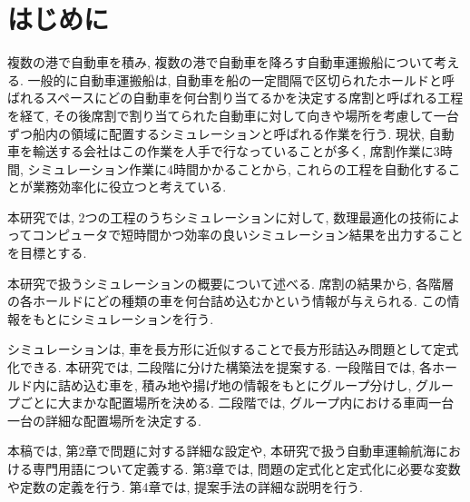 \chapter{はじめに}

複数の港で自動車を積み, 複数の港で自動車を降ろす自動車運搬船について考える. 
一般的に自動車運搬船は, 自動車を船の一定間隔で区切られたホールドと呼ばれるスペースにどの自動車を何台割り当てるかを決定する席割と呼ばれる工程を経て, その後席割で割り当てられた自動車に対して向きや場所を考慮して一台ずつ船内の領域に配置するシミュレーションと呼ばれる作業を行う. 
現状, 自動車を輸送する会社はこの作業を人手で行なっていることが多く, 席割作業に3時間, シミュレーション作業に4時間かかることから, これらの工程を自動化することが業務効率化に役立つと考えている. 

本研究では, 2つの工程のうちシミュレーションに対して, 数理最適化の技術によってコンピュータで短時間かつ効率の良いシミュレーション結果を出力することを目標とする. 

本研究で扱うシミュレーションの概要について述べる. 
席割の結果から, 各階層の各ホールドにどの種類の車を何台詰め込むかという情報が与えられる. 
この情報をもとにシミュレーションを行う. 

シミュレーションは, 車を長方形に近似することで長方形詰込み問題として定式化できる. 
本研究では, 二段階に分けた構築法を提案する. 
一段階目では, 各ホールド内に詰め込む車を, 積み地や揚げ地の情報をもとにグループ分けし, グループごとに大まかな配置場所を決める. 
二段階では, グループ内における車両一台一台の詳細な配置場所を決定する. 

本稿では, 第2章で問題に対する詳細な設定や, 本研究で扱う自動車運輸航海における専門用語について定義する. 
第3章では, 問題の定式化と定式化に必要な変数や定数の定義を行う. 
第4章では, 提案手法の詳細な説明を行う. 
